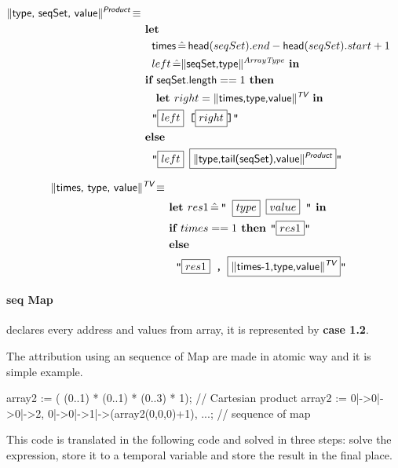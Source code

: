 \documentclass{llncs}
\newcommand{\trad}[2]{\ensuremath{\lVert \textsf{#1} \rVert^{\textit{#2}}}}
\DeclareMathOperator{\isdef}{\equiv}
\newcommand{\llvm}[1]{\texttt{#1}}
\newcommand{\B}[1]{\textsf{#1}}
\newcommand{\IF}[0]{\textbf{ if }}
\newcommand{\ELSE}[0]{\textbf{ else }}
\newcommand{\THEN}[0]{\textbf{ then }}
\newcommand{\LET}[0]{\textbf{ let }}
\DeclareMathOperator{\BE}{\hat{=}}
\newcommand{\IN}[0]{\textbf{ in }}
\newcommand{\PH}[1]{\framebox{$#1$}}
\begin{document}
\begin{align*}
\begin{split}
  \trad{type, seqSet, value}{\B{Product}} \isdef \\
   & \LET\\
   & \quad \B{times} \BE \B{head}(seqSet).end - \B{head}(seqSet).start + 1\\
   & \quad left \BE \trad{seqSet,type}{ArrayType} \IN \\
   & \IF \B{seqSet.length} == 1 \THEN  \\
   & \quad \LET right = \trad{times,type,value}{\B{TV}} \IN\\
   & \quad \llvm{"\PH{left} [\PH{right}]"}  \\
   & \ELSE \\
   & \quad \llvm{"\PH{left} \PH{\trad{type,tail(seqSet),value}{\B{Product}}}"}\\
\end{split}
\end{align*}

\begin{align*}
\begin{split}
  \trad{times, type, value}{\B{TV}} \isdef \\
   &\LET res1 \BE \llvm{" \PH{type} \PH{value} "} \IN\\
   & \IF times == 1 \THEN \llvm{"\PH{res1}"} \\
   & \ELSE\\
   & \quad \llvm{"\PH{res1} , \PH{\trad{times-1,type,value}{\B{TV}}}"} \\
\end{split}
\end{align*}



\paragraph{seq Map} declares every address and values from array, it is represented by \textbf{case 1.2}.

The attribution using an sequence of Map are made in atomic way and it is simple example.


\begin{pascalcode}
 array2 := ( (0..1) * (0..1) * (0..3) * {1}); // Cartesian product
 array2 := { 0|->0|->0|->2, 0|->0|->1|->(array2(0,0,0)+1), ...}; // sequence of map
\end{pascalcode}

This code is translated in the following code and solved in three steps: solve 
the expression, store it to a temporal variable and  store the result in the 
final place.
\end{document}
